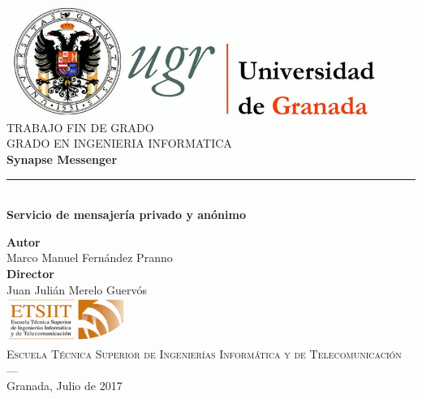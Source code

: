 \begin{titlepage}
 
 
\newlength{\centeroffset}
\setlength{\centeroffset}{-0.5\oddsidemargin}
\addtolength{\centeroffset}{0.5\evensidemargin}
\thispagestyle{empty}

\noindent\hspace*{\centeroffset}\begin{minipage}{\textwidth}

\centering
\includegraphics[width=0.9\textwidth]{imagenes/logo_ugr.jpg}\\[1.4cm]

\textsc{ \Large TRABAJO FIN DE GRADO\\[0.2cm]}
\textsc{ GRADO EN INGENIERIA INFORMATICA}\\[1cm]
% 
{\Huge\bfseries Synapse Messenger\\}
\noindent\rule[-1ex]{\textwidth}{3pt}\\[3.5ex]
{\large\bfseries Servicio de mensajería privado y anónimo}
\end{minipage}

\vspace{2.5cm}
\noindent\hspace*{\centeroffset}\begin{minipage}{\textwidth}
\centering

\textbf{Autor}\\ {Marco Manuel Fernández Pranno}\\[2.5ex]
\textbf{Director}\\ {Juan Julián Merelo Guervós}\\[2cm]
\includegraphics[width=0.3\textwidth]{imagenes/etsiit_logo.png}\\[0.1cm]
\textsc{Escuela Técnica Superior de Ingenierías Informática y de Telecomunicación}\\
\textsc{---}\\
Granada, Julio de 2017
\end{minipage}
\end{titlepage}


